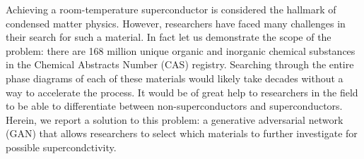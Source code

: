 \documentclass{article}
\begin{document}
Achieving a room-temperature superconductor is considered the hallmark of condensed matter physics.
However, researchers have faced many challenges in their search for such a material.
In fact let us demonstrate the scope of the problem: there are 168 million unique organic and inorganic chemical substances in the Chemical Abstracts Number (CAS) registry.
Searching through the entire phase diagrams of each of these materials would likely take decades without a way to accelerate the process.
It would be of great help to researchers in the field to be able to differentiate between non-superconductors and superconductors.
Herein, we report a solution to this problem: a generative adversarial network (GAN) that allows researchers to select which materials to further investigate for possible supercondctivity.
\end{document}
